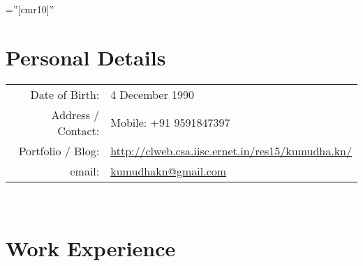 \documentclass[a4paper,10pt]{article} %
\begin{document}
\pagestyle{empty} %

\font\fb=''[cmr10]'' %


\par{\bigskip\par} %

\section{Personal Details}
\begin{tabular}{rl}
Date of Birth: & 4 December 1990 \\
Address / Contact: & Mobile: +91 9591847397 \\
Portfolio / Blog: & \href{http://clweb.csa.iisc.ernet.in/res15/kumudha.kn/}{http://clweb.csa.iisc.ernet.in/res15/kumudha.kn/}\\
email: & \href{mailto:kumudhakn@gmail.com}{kumudhakn@gmail.com}\\ 
\end{tabular}
\\

\section{Work Experience}
\end{document}
